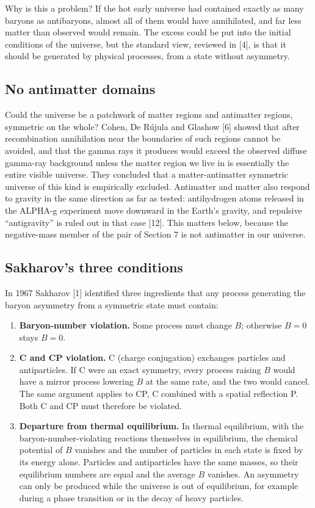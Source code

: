 \documentclass[11pt]{article}
\begin{document}
Why is this a problem? If the hot early universe had contained exactly as many baryons as antibaryons, almost all of them would have annihilated, and far less matter than observed would remain. The excess could be put into the initial conditions of the universe, but the standard view, reviewed in [4], is that it should be generated by physical processes, from a state without asymmetry.

\subsection{No antimatter domains}

Could the universe be a patchwork of matter regions and antimatter regions, symmetric on the whole? Cohen, De Rújula and Glashow [6] showed that after recombination annihilation near the boundaries of such regions cannot be avoided, and that the gamma rays it produces would exceed the observed diffuse gamma-ray background unless the matter region we live in is essentially the entire visible universe. They concluded that a matter-antimatter symmetric universe of this kind is empirically excluded. Antimatter and matter also respond to gravity in the same direction as far as tested: antihydrogen atoms released in the ALPHA-g experiment move downward in the Earth's gravity, and repulsive ``antigravity'' is ruled out in that case [12]. This matters below, because the negative-mass member of the pair of Section 7 is not antimatter in our universe.

\subsection{Sakharov's three conditions}

In 1967 Sakharov [1] identified three ingredients that any process generating the baryon asymmetry from a symmetric state must contain:

\begin{enumerate}
\item \textbf{Baryon-number violation.} Some process must change $B$; otherwise $B=0$ stays $B=0$.
\item \textbf{C and CP violation.} C (charge conjugation) exchanges particles and antiparticles. If C were an exact symmetry, every process raising $B$ would have a mirror process lowering $B$ at the same rate, and the two would cancel. The same argument applies to CP, C combined with a spatial reflection P. Both C and CP must therefore be violated.
\item \textbf{Departure from thermal equilibrium.} In thermal equilibrium, with the baryon-number-violating reactions themselves in equilibrium, the chemical potential of $B$ vanishes and the number of particles in each state is fixed by its energy alone. Particles and antiparticles have the same masses, so their equilibrium numbers are equal and the average $B$ vanishes. An asymmetry can only be produced while the universe is out of equilibrium, for example during a phase transition or in the decay of heavy particles.
\end{enumerate}
\end{document}
